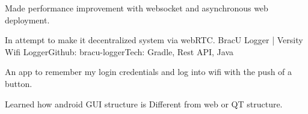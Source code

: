         \item {Made performance improvement with websocket and asynchronous web deployment.}
        \item {In attempt to make it decentralized system via webRTC.}
      \resumeItemListEnd
    \vspace{-2mm}
    \resumeProject
      {BracU Logger | Versity Wifi Logger}{Github: bracu-logger}{Tech: Gradle, Rest API, Java}{}
      \resumeItemListStart
        \item {An app to remember my login credentials and log into wifi with the push of a button.}
        \item {Learned how android GUI structure is Different from web or QT structure.}
      \resumeItemListEnd
\resumeSubHeadingListEnd

